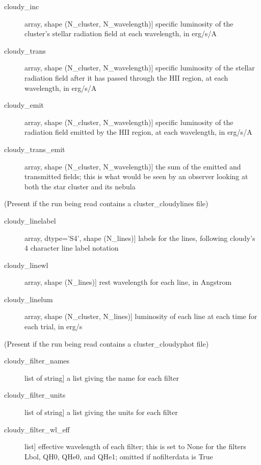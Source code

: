 \documentclass[letterpaper,10pt,english]{sphinxmanual}
\begin{document}
\begin{fulllineitems}
\begin{description}
\begin{description}
\item[{cloudy\_inc}] \leavevmode{[}array, shape (N\_cluster, N\_wavelength){]}
specific luminosity of the cluster's stellar radiation field at
each wavelength, in erg/s/A

\item[{cloudy\_trans}] \leavevmode{[}array, shape (N\_cluster, N\_wavelength){]}
specific luminosity of the stellar radiation field after it has
passed through the HII region, at each wavelength, in erg/s/A

\item[{cloudy\_emit}] \leavevmode{[}array, shape (N\_cluster, N\_wavelength){]}
specific luminosity of the radiation field emitted by the HII
region, at each wavelength, in erg/s/A

\item[{cloudy\_trans\_emit}] \leavevmode{[}array, shape (N\_cluster, N\_wavelength){]}
the sum of the emitted and transmitted fields; this is what
would be seen by an observer looking at both the star cluster
and its nebula

\end{description}

(Present if the run being read contains a cluster\_cloudylines file)
\begin{description}
\item[{cloudy\_linelabel}] \leavevmode{[}array, dtype='S4', shape (N\_lines){]}
labels for the lines, following cloudy's 4 character line label
notation

\item[{cloudy\_linewl}] \leavevmode{[}array, shape (N\_lines){]}
rest wavelength for each line, in Angstrom

\item[{cloudy\_linelum}] \leavevmode{[}array, shape (N\_cluster, N\_lines){]}
luminosity of each line at each time for each trial, in erg/s

\end{description}

(Present if the run being read contains a cluster\_cloudyphot file)
\begin{description}
\item[{cloudy\_filter\_names}] \leavevmode{[}list of string{]}
a list giving the name for each filter

\item[{cloudy\_filter\_units}] \leavevmode{[}list of string{]}
a list giving the units for each filter

\item[{cloudy\_filter\_wl\_eff}] \leavevmode{[}list{]}
effective wavelength of each filter; this is set to None for the
filters Lbol, QH0, QHe0, and QHe1; omitted if nofilterdata is
True


\end{description}
\end{description}
\end{fulllineitems}
\end{document}
